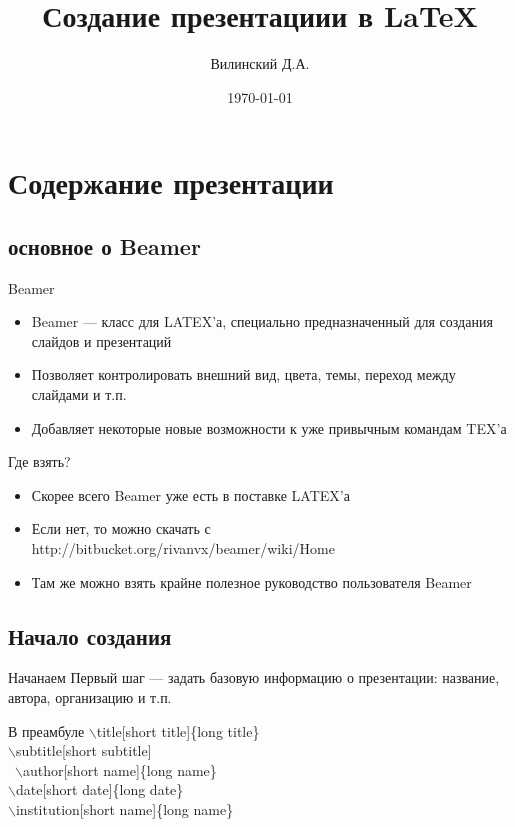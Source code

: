 \documentclass[ignorenonframetext]{beamer}
\author{Вилинский Д.А.}
\title{Создание презентациии в LaTeX}
\institute{УрФУ}
\date{\today}
\begin{document}
\frame{\titlepage}
\chapter{Содержание презентации}
\section{основное о Beamer}
\begin{frame}{Beamer}
\begin{itemize}
\item Beamer — класс для LATEX’а, специально предназначенный
для создания слайдов и презентаций
\item Позволяет контролировать внешний вид, цвета, темы,
переход между слайдами и т.п.
\item Добавляет некоторые новые возможности к уже
привычным командам TEX’а
\end{itemize}
\end{frame}

\begin{frame}{Где взять?}
\begin{itemize}
\item Скорее всего Beamer уже есть в поставке LATEX’а
\item Если нет, то можно скачать с
http://bitbucket.org/rivanvx/beamer/wiki/Home
\item Там же можно взять крайне полезное руководство
пользователя Beamer
\end{itemize}
\end{frame}
\section{Начало создания}

\begin{frame}{Начанаем}
Первый шаг — задать базовую информацию о презентации:
название, автора, организацию и т.п.\\
\begin{block}{В преамбуле}
$\backslash$title[short title]\{long title\}\\
$\backslash$subtitle[short subtitle]\\\
$\backslash$author[short name]\{long name\}\\
$\backslash$date[short date]\{long date\}\\
$\backslash$institution[short name]\{long name\}\\
\end{block}
\end{frame}
\end{document}
